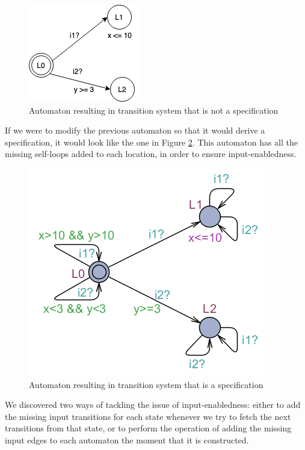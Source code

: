 \begin{figure}
  \centering
  \includegraphics[scale=0.7]{figures/inputEnablednessBefore.png}
  \caption{Automaton resulting in transition system that is not a specification}
  \label{fig:beforeInputEnabledness}
\end{figure}

If we were to modify the previous automaton so that it would derive a specification, it would look like the one in Figure \ref{fig:afterInputEnabledness}. This automaton has all the missing self-loops added to each location, in order to ensure input-enabledness.

\begin{figure}
  \centering
  \includegraphics[scale=0.7]{figures/inputEnablednessAfter.png}
  \caption{Automaton resulting in transition system that is a specification}
  \label{fig:afterInputEnabledness}
\end{figure}

We discovered two ways of tackling the issue of input-enabledness: either to add the missing input transitions for each state whenever we try to fetch the next transitions from that state, or to perform the operation of adding the missing input edges to each automaton the moment that it is constructed.

